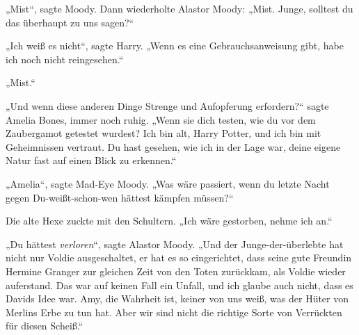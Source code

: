 „Mist“, sagte Moody. Dann wiederholte Alastor Moody:
„Mist. Junge, solltest du das überhaupt zu uns sagen?“

„Ich weiß es nicht“, sagte Harry.
„Wenn es eine Gebrauchsanweisung gibt, habe ich noch nicht reingesehen.“

„Mist.“

„Und wenn diese anderen Dinge Strenge und Aufopferung erfordern?“ sagte Amelia Bones, immer noch ruhig.
„Wenn sie dich testen, wie du vor dem Zaubergamot getestet wurdest? Ich bin alt, Harry Potter, und ich bin mit Geheimnissen vertraut. Du hast gesehen, wie ich in der Lage war, deine eigene Natur fast auf einen Blick zu erkennen.“

„Amelia“, sagte Mad-Eye Moody.
„Was wäre passiert, wenn du letzte Nacht gegen Du-weißt-schon-wen hättest kämpfen müssen?“

Die alte Hexe zuckte mit den Schultern.
„Ich wäre gestorben, nehme ich an.“

„Du hättest \emph{verloren}“, sagte Alastor Moody.
„Und der Junge-der-überlebte hat nicht nur Voldie ausgeschaltet, er hat es so eingerichtet, dass seine gute Freundin Hermine Granger zur gleichen Zeit von den Toten zurückkam, als Voldie wieder auferstand. Das war auf keinen Fall ein Unfall, und ich glaube auch nicht, dass es Davids Idee war. Amy, die Wahrheit ist, keiner von uns weiß, was der Hüter von Merlins Erbe zu tun hat. Aber wir sind nicht die richtige Sorte von Verrückten für diesen Scheiß.“

